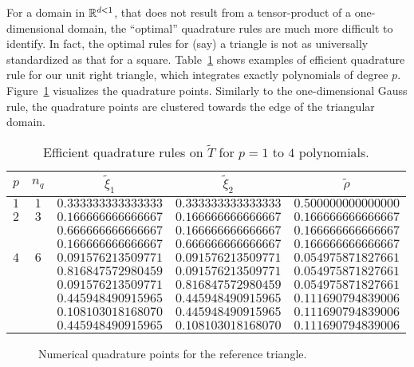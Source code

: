 For a domain in $\mathbb{R}^{d < 1}$, that does not result from a tensor-product of a one-dimensional domain, the ``optimal'' quadrature rules are much more difficult to identify.  In fact, the optimal rules for (say) a triangle is not as universally standardized as that for a square. Table~\ref{tb:fe_impl_integ_gauss2} shows examples of efficient quadrature rule for our unit right triangle, which integrates exactly polynomials of degree $p$.  Figure~\ref{fig:fe_impl_integ_gauss2} visualizes the quadrature points.  Similarly to the one-dimensional Gauss rule, the quadrature points are clustered towards the edge of the triangular domain.


\begin{table}
  \centering
  \begin{tabular}{ccccc}
    $p$ & $n_q$ & $\tilde \xi_1$ & $\tilde \xi_2$ & $\tilde \rho$ \\
    \hline
    $1$ & $1$ & $0.333333333333333$ & $0.333333333333333$ & $0.500000000000000$ \\
    \hline
    $2$ & $3$ & $0.166666666666667$ & $0.166666666666667$ & $0.166666666666667$ \\ 
    & & $0.666666666666667$ & $0.166666666666667$ & $0.166666666666667$ \\ 
    & & $0.166666666666667$ & $0.666666666666667$ & $0.166666666666667$ \\ 
    \hline
    $4$ & $6$ & $0.091576213509771$ & $0.091576213509771$ & $0.054975871827661$ \\ 
    & & $0.816847572980459$ & $0.091576213509771$ & $0.054975871827661$ \\ 
    & & $0.091576213509771$ & $0.816847572980459$ & $0.054975871827661$ \\ 
    & & $0.445948490915965$ & $0.445948490915965$ & $0.111690794839006$ \\
    & & $0.108103018168070$ & $0.445948490915965$ & $0.111690794839006$ \\ 
    & & $0.445948490915965$ & $0.108103018168070$ & $0.111690794839006$ \\ 
  \end{tabular}
  \caption{Efficient quadrature rules on $\tilde T$ for $p = 1$ to $4$ polynomials.}
  \label{tb:fe_impl_integ_gauss2}
\end{table}

\begin{figure}
  \centering
  \caption{Numerical quadrature points for the reference triangle.}
  \label{fig:fe_impl_integ_gauss2}
\end{figure}

